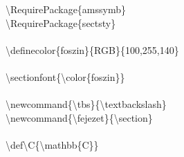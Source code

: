 \documentclass[11pt]{beamer}
\newcommand{\tbs}{\textbackslash}
\begin{document}
\begin{frame}
\tbs RequirePackage\{amssymb\} \\
\tbs RequirePackage\{sectsty\} \\
\ \\
\tbs definecolor\{foszin\}\{RGB\}\{100,255,140\} \\
\ \\
\tbs sectionfont\{\tbs color\{foszin\}\} \\
\ \\
\tbs newcommand\{\tbs tbs\}\{\tbs textbackslash\} \\
\tbs newcommand\{\tbs fejezet\}\{\tbs section\} \\
\ \\
\tbs def\tbs C\{\tbs mathbb\{C\}\}
\end{frame}
\end{document}
